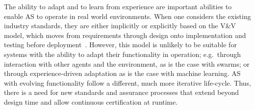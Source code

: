 \documentclass[sigconf,nonacm]{acmart}%
\begin{document}
	The ability to adapt and to learn from experience are important abilities to enable AS to operate in real world environments. When one considers the existing industry standards, they are either implicitly or explicitly based on the V\&V model, which moves from requirements through design onto implementation and testing before deployment~\cite{Jia2021}. 
	However, this model is unlikely to be suitable for systems with the ability to adapt their functionality in operation; e.g.\ through interaction with other agents and the environment, as is the case with swarms; or through experience-driven adaptation as is the case with machine learning. AS with evolving functionality follow a different, much more iterative life-cycle. 
	Thus, there is a need for new standards and assurance processes that extend beyond design time and allow continuous certification at runtime. 
\end{document}
